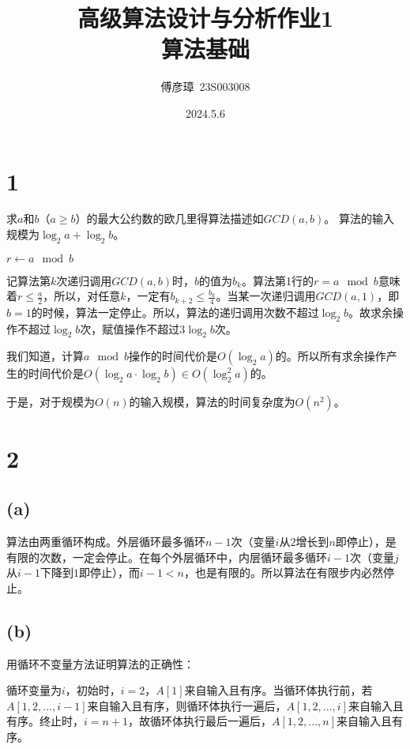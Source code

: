 \documentclass{ctexart}
\title{高级算法设计与分析作业1\\算法基础}
\author{傅彦璋\ 23S003008}
\date{2024.5.6}
\begin{document}
\maketitle

\section*{1}

求$a$和$b$（$a \ge b$）的最大公约数的欧几里得算法描述如$GCD(a,b)$。 算法的输入规模为$\log_2 a + \log_2 b$。


\begin{algorithm}[H]
  \SetAlgoLined
  $r \leftarrow a \mod b$  \;
  \caption{$GCD(a,b)$}
\end{algorithm}

记算法第$k$次递归调用$GCD(a,b)$时，$b$的值为$b_k$。算法第1行的$r = a\mod b$意味着$r\le \frac{a}{2}$，所以，对任意$k$，一定有$b_{k+2}\le \frac{b_k}{4}$。当某一次递归调用$GCD(a,1)$，即$b=1$的时候，算法一定停止。所以，算法的递归调用次数不超过$\log_2 b$。故求余操作不超过$\log_2 b$次，赋值操作不超过$3\log_2 b$次。

我们知道，计算$a \mod b$操作的时间代价是$O(\log_2 a)$的。所以所有求余操作产生的时间代价是$O(\log_2 a \cdot \log_2 b)\in O(\log^2_2 a)$的。

于是，对于规模为$O(n)$的输入规模，算法的时间复杂度为$O(n^2)$。





\section*{2}
\subsection*{(a)}

算法由两重循环构成。外层循环最多循环$n-1$次（变量$i$从$2$增长到$n$即停止），是有限的次数，一定会停止。在每个外层循环中，内层循环最多循环$i-1$次（变量$j$从$i-1$下降到$1$即停止），而$i-1 < n$，也是有限的。所以算法在有限步内必然停止。


\subsection*{(b)}
用循环不变量方法证明算法的正确性：

循环变量为$i$，初始时，$i=2$，$A[1]$来自输入且有序。当循环体执行前，若$A[1,2,...,i-1]$来自输入且有序，则循环体执行一遍后，$A[1,2,...,i]$来自输入且有序。终止时，$i=n+1$，故循环体执行最后一遍后，$A[1,2,...,n]$来自输入且有序。
\end{document}
